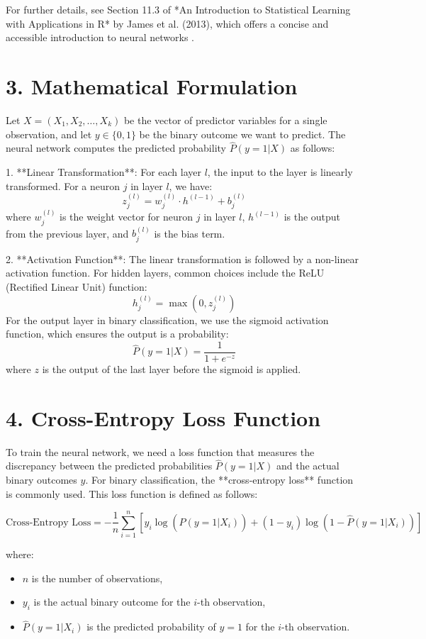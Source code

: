 \documentclass{article}
\begin{document}
For further details, see Section 11.3 of *An Introduction to Statistical Learning with Applications in R* by James et al. (2013), which offers a concise and accessible introduction to neural networks \cite{james2013introduction}.

\section*{3. Mathematical Formulation}

Let \( X = (X_1, X_2, \dots, X_k) \) be the vector of predictor variables for a single observation, and let \( y \in \{0, 1\} \) be the binary outcome we want to predict. The neural network computes the predicted probability \( \hat{P}(y=1 | X) \) as follows:

1. **Linear Transformation**: For each layer \( l \), the input to the layer is linearly transformed. For a neuron \( j \) in layer \( l \), we have:
   \[
   z_j^{(l)} = w_j^{(l)} \cdot h^{(l-1)} + b_j^{(l)}
   \]
   where \( w_j^{(l)} \) is the weight vector for neuron \( j \) in layer \( l \), \( h^{(l-1)} \) is the output from the previous layer, and \( b_j^{(l)} \) is the bias term.

2. **Activation Function**: The linear transformation is followed by a non-linear activation function. For hidden layers, common choices include the ReLU (Rectified Linear Unit) function:
   \[
   h_j^{(l)} = \max(0, z_j^{(l)})
   \]
   For the output layer in binary classification, we use the sigmoid activation function, which ensures the output is a probability:
   \[
   \hat{P}(y=1 | X) = \frac{1}{1 + e^{-z}}
   \]
   where \( z \) is the output of the last layer before the sigmoid is applied.

\section*{4. Cross-Entropy Loss Function}

To train the neural network, we need a loss function that measures the discrepancy between the predicted probabilities \( \hat{P}(y=1 | X) \) and the actual binary outcomes \( y \). For binary classification, the **cross-entropy loss** function is commonly used. This loss function is defined as follows:

\[
\text{Cross-Entropy Loss} = -\frac{1}{n} \sum_{i=1}^{n} \left[ y_i \log(\hat{P}(y=1 | X_i)) + (1 - y_i) \log(1 - \hat{P}(y=1 | X_i)) \right]
\]

where:
\begin{itemize}
    \item \( n \) is the number of observations,
    \item \( y_i \) is the actual binary outcome for the \( i \)-th observation,
    \item \( \hat{P}(y=1 | X_i) \) is the predicted probability of \( y = 1 \) for the \( i \)-th observation.
\end{itemize}
\end{document}
